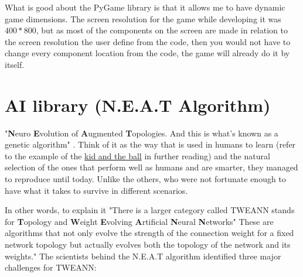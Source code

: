 What is good about the PyGame library is that it allows me to have dynamic game dimensions. The screen resolution for the game while developing it was $400*800$, but as most of the components on the screen are made in relation to the screen resolution the user define from the code, then you would not have to change every component location from the code, the game will already do it by itself.

\section{AI library (N.E.A.T Algorithm)}\label{sec:ai-library-neat-algorithm}
"\textbf{N}euro \textbf{E}volution of \textbf{A}ugmented \textbf{T}opologies. And this is what's known as a genetic algorithm" \cite{Python_Pong_AI_Tutorial_-_Using_NEAT}. Think of it as the way that is used in humans to learn (refer to the example of the \hyperref[sec:ai-life-example]{kid and the ball} in further reading) and the natural selection of the ones that perform well as humans and are smarter, they managed to reproduce until today. Unlike the others, who were not fortunate enough to have what it takes to survive in different scenarios.

In other words, to explain it "There is a larger category called TWEANN stands for \textbf{T}opology and \textbf{W}eight \textbf{E}volving \textbf{A}rtificial \textbf{N}eural \textbf{N}etworks" \cite{A.I_Learns_to_Play_Soni_the_Hedgehog_-_NEAT_Explained} These are algorithms that not only evolve the strength of the connection weight for a fixed network topology but actually evolves both the topology of the network and its weights." The scientists behind the N.E.A.T algorithm identified three major challenges for TWEANN:

